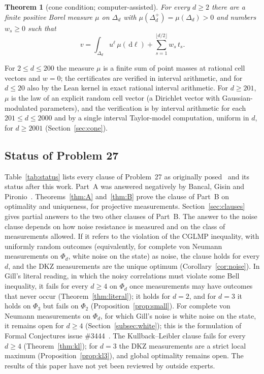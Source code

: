 \documentclass[11pt]{amsart}
\newtheorem{introthm}{Theorem}
\theoremstyle{definition}
\theoremstyle{remark}
\numberwithin{equation}{section}
\newcommand{\dd}{\,\mathrm{d}}
\begin{document}
\begin{introthm}[cone condition; computer-assisted]\label{thm:E}
For every $d\ge2$ there are a finite positive Borel measure $\mu$ on $\Delta_d$ with $\mu(\Delta_d^+)=\mu(\Delta_d)>0$
and numbers $w_s\ge0$ such that
\begin{equation}\label{eq:cone}
v=\int_{\Delta_d}u^\ell\,\mu(\dd\ell)+\sum_{s=1}^{\lfloor d/2\rfloor}w_s\,t_s .
\end{equation}
\end{introthm}

For $2\le d\le200$ the measure $\mu$ is a finite sum of point masses at rational cell vectors and $w=0$; the
certificates are verified in interval arithmetic, and for $d\le20$ also by the Lean kernel in exact rational interval
arithmetic. For $d\ge201$, $\mu$ is the law of an explicit random cell vector
(a Dirichlet vector with Gaussian-modulated parameters), and the verification is by interval arithmetic for each
$201\le d\le2000$ and by a single interval Taylor-model computation, uniform in $d$, for $d\ge2001$
(Section~\ref{sec:cone}).

\subsection{Status of Problem 27}
Table~\ref{tab:status} lists every clause of Problem~27 as originally posed~\cite{OQP} and its status after this work.
Part~A was answered negatively by Bancal, Gisin and Pironio~\cite{BGP}. Theorems~\ref{thm:A} and~\ref{thm:B} prove
the clause of Part~B on optimality and uniqueness, for projective measurements. Section~\ref{sec:clauses} gives partial
answers to the two other clauses of Part~B. The answer to the noise clause depends on how noise resistance is measured
and on the class of measurements allowed. If it refers to the violation of the CGLMP inequality, with uniformly random
outcomes (equivalently, for complete von Neumann measurements on $\Phi_d$, white noise on the state) as noise, the
clause holds for every $d$, and the DKZ measurements are the unique optimum (Corollary~\ref{cor:noise}). In Gill's
literal reading, in which the noisy correlations must violate some Bell inequality, it fails for every $d\ge4$ on
$\Phi_d$ once measurements may have outcomes that never occur (Theorem~\ref{thm:literal}); it holds for $d=2$, and for
$d=3$ it holds on $\Phi_3$ but fails on $\Phi_2$ (Proposition~\ref{prop:small}). For complete von Neumann measurements on
$\Phi_d$, for which Gill's noise is white noise on the state, it remains open for $d\ge4$ (Section~\ref{subsec:white});
this is the formulation of Formal Conjectures issue \#3444~\cite{FC3444}. The Kullback--Leibler clause fails for every
$d\ge4$ (Theorem~\ref{thm:kl}); for $d=3$ the DKZ measurements are a strict local maximum
(Proposition~\ref{prop:kl3}), and global optimality remains open. The results of this paper have not yet been
reviewed by outside experts.
\end{document}
